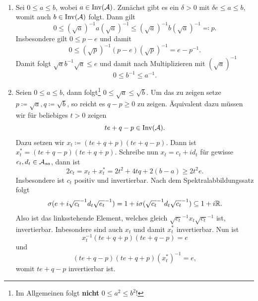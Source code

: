\begin{remark}{\ }
\begin{enumerate}
        \item Sei $0 \leq a \leq b$, wobei $a \in \operatorname*{Inv}(\mathcal{A})$. Zunächst gibt es ein $\delta > 0$ mit $\delta e \leq a \leq b$, womit auch $b \in \operatorname*{Inv}(\mathcal{A})$ folgt. Dann gilt
        $$ 0 \leq (\sqrt{a})^{-1} a (\sqrt{a})^{-1} \leq (\sqrt{a})^{-1} b (\sqrt{a})^{-1} \eqqcolon p. $$
        Insbesondere gilt $0 \leq p-e$ und damit
        $$ 0 \leq (\sqrt{p})^{-1} (p-e) (\sqrt{p})^{-1} = e-p^{-1}. $$
        Damit folgt $\sqrt{a} b^{-1} \sqrt{a} \leq e$ und damit nach Multiplizieren mit $(\sqrt{a})^{-1}$
        $$ 0 \leq b^{-1} \leq a^{-1}. $$

        \item Seien $0 \leq a \leq b$, dann folgt\footnote{Im Allgemeinen folgt \textbf{nicht} $0 \leq a^2 \leq b^2$!} $0 \leq \sqrt{a} \leq \sqrt{b}$. Um das zu zeigen setze $p \coloneqq \sqrt{a}, q \coloneqq \sqrt{b}$, so reicht es $q - p \geq 0$ zu zeigen. Äquivalent dazu müssen wir für beliebiges $t > 0$ zeigen
        $$ te + q - p \in \operatorname*{Inv}(\mathcal{A}). $$
        Dazu setzen wir $x_t \coloneqq (te + q + p)(te + q - p)$. Dann ist $x_t^* = (te + q - p)(te + q + p)$. Schreibe nun $x_t = c_t + i d_t$ für gewisse $c_t, d_t \in \mathcal{A}_{sa}$, dann ist
        $$ 2 c_t = x_t + x_t^* = 2 t^2 + 4 t q + 2(b-a) \geq 2 t^2 e. $$
        Insbesondere ist $c_t$ positiv und invertierbar. Nach dem Spektralabbildungssatz folgt
        $$ \sigma(e + i \sqrt{c_t}^{-1} d_t \sqrt{e_t}^{-1}) = 1 + i \sigma(\sqrt{c_t}^{-1} d_t \sqrt{c_t}^{-1}) \subseteq 1 + i \mathbb{R}. $$
        Also ist das linksstehende Element, welches gleich $ \sqrt{c_t}^{-1} x_t \sqrt{c_t}^{-1} $ ist, invertierbar. Inbesondere sind auch $x_t$ und damit $x_t^*$ invertierbar. Nun ist
        $$ x_t^{-1} (te + q + p)(te + q - p) = e $$
        und
        $$ (te + q - p)(te + q + p)(x_t^*)^{-1} = e, $$
        womit $te + q - p$ invertierbar ist.
    \end{enumerate}
\end{remark}